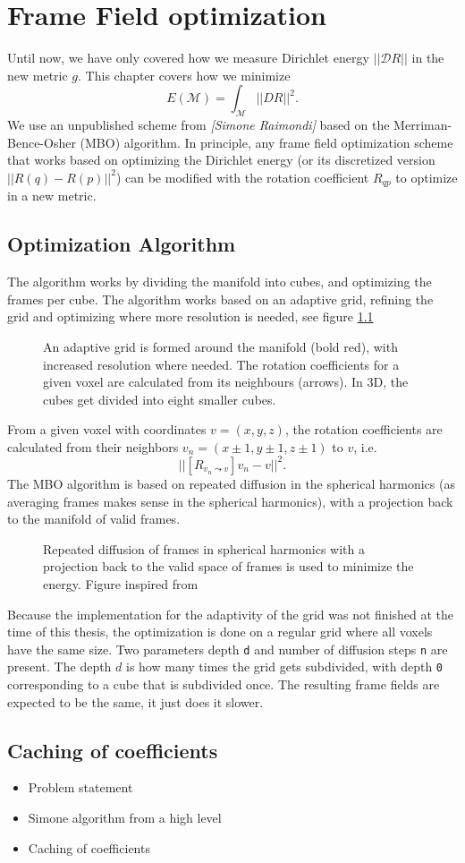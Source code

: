 \documentclass[../thesis.tex]{subfiles}
\begin{document}
\chapter{Frame Field optimization}
\label{ch:optimization}
Until now, we have only covered how we measure Dirichlet energy $||\mathcal{D}R||$ in
the new metric $g$.
This chapter covers how we minimize
$$E(\mathcal{M})=\int_{\mathcal{M}}||DR||^2.$$
We use an unpublished scheme from \emph{[Simone Raimondi]} based
on the Merriman-Bence-Osher (MBO) algorithm.
In principle, any frame field optimization scheme that works based on
optimizing the Dirichlet energy (or its discretized version $||R(q)-R(p)||^2$) can be
modified with the rotation coefficient $R_{qp}$ to optimize in a new metric.
\section{Optimization Algorithm}
The algorithm works by dividing the manifold into cubes,
and optimizing the frames per cube. The algorithm works based on an adaptive
grid, refining the grid and optimizing where more resolution is needed, see figure \ref{fig:grid} 
\begin{figure}[htb]
    \centering
    \def\svgwidth{20em}
    
    \caption{An adaptive grid is formed around the manifold (bold red), with increased resolution where needed.
    The rotation coefficients for a given voxel are calculated from its neighbours (arrows).
    In 3D, the cubes get divided into eight smaller cubes.}
    \label{fig:grid}
\end{figure}
From a given voxel with coordinates $v=(x,y,z)$, the rotation coefficients
are calculated from their neighbors $v_n=(x\pm 1,y\pm 1,z\pm 1)$ to $v$,
i.e. $$||[R_{v_n\leadsto v}]v_n - v||^2.$$
The MBO algorithm is based on repeated diffusion in the spherical harmonics (as averaging frames
makes sense in the spherical harmonics), with a projection back to the manifold
of valid frames.
\begin{figure}[htb]
    \centering
    \def\svgwidth{20em}
    
    \caption{Repeated diffusion of frames in spherical harmonics with a projection back to the
    valid space of frames is used to minimize the energy. Figure inspired from \cite{Palmer} }
    \label{fig:diffusionprojection}
\end{figure}


Because the implementation for the adaptivity of the grid was not finished
at the time of this thesis, the optimization is done on a regular grid where
all voxels have the same size. Two parameters depth \texttt{d} and number of diffusion steps \texttt{n}
are present. The depth $d$ is how many times the grid gets subdivided, with depth \texttt{0}
corresponding to a cube that is subdivided once.
The resulting frame fields are expected to be the same, it just does it slower.

\section{Caching of coefficients}

\begin{itemize}
    \item Problem statement
    \item Simone algorithm from a high level
    \item Caching of coefficients
\end{itemize}
\end{document}
